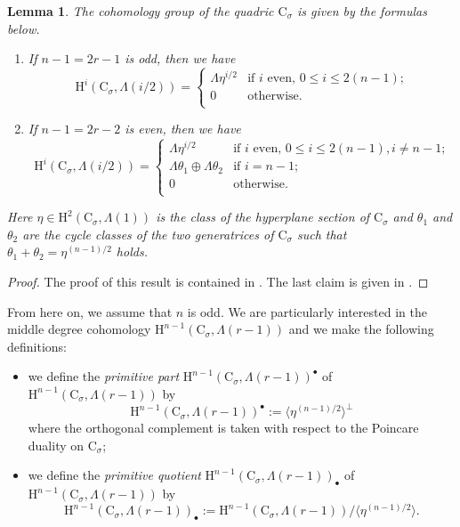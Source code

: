 \documentclass[10pt]{amsart}
\numberwithin{equation}{section}
\newtheorem{lemma}[equation]{Lemma}
\theoremstyle{definition}
\def\rmC{\mathrm{C}}
\def\rmH{\mathrm{H}}
\begin{document}
\begin{lemma}\label{quadric-class}
The cohomology group of the quadric $\rmC_{\sigma}$ is given by the formulas below.
\begin{enumerate}
\item If $n-1=2r-1$ is odd, then we have 
\begin{equation*}
\rmH^{i}(\rmC_{\sigma}, \Lambda(i/2))=\begin{cases}\Lambda\eta^{i/2} & \text{if $i$ even, $0\leq i\leq 2(n-1)$;}\\ 0 & \text{otherwise.}\\ \end{cases}
\end{equation*}
\item If $n-1=2r-2$ is even, then we have 
\begin{equation*}
\rmH^{i}(\rmC_{\sigma}, \Lambda(i/2))=\begin{cases}\Lambda\eta^{i/2} & \text{if $i$ even, $0\leq i\leq 2(n-1), i\neq n-1$;}\\   \Lambda\theta_{1}\oplus\Lambda\theta_{2} & \text{if $i=n-1$;}\\0 & \text{otherwise.}\\ \end{cases}
\end{equation*}
\end{enumerate}
Here $\eta\in \rmH^{2}(\rmC_{\sigma},\Lambda(1))$ is the class of the hyperplane section of $\rmC_{\sigma}$ and $\theta_{1}$ and $\theta_{2}$ are the cycle classes of the two generatrices of $\rmC_{\sigma}$ such that $\theta_{1}+\theta_{2}=\eta^{(n-1)/2}$ holds.
\end{lemma}
\begin{proof}
The proof of this result is contained in \cite[Expose XII Theorem 3.3]{SGA7}. The last claim is given in \cite[Theorem 3.3 (iii)(c)]{SGA7}.
\end{proof}

From here on, we assume that $n$ is odd. We are particularly interested in the middle degree cohomology $\rmH^{n-1}(\rmC_{\sigma}, \Lambda(r-1))$ and we make the following definitions: 
\begin{itemize}
\item we define the {\em primitive part} $\rmH^{n-1}(\rmC_{\sigma}, \Lambda(r-1))^{\bullet}$ of $\rmH^{n-1}(\rmC_{\sigma}, \Lambda(r-1))$ by
\begin{equation*}
\rmH^{n-1}(\rmC_{\sigma}, \Lambda(r-1))^{\bullet}:=\langle\eta^{(n-1)/2}\rangle^{\perp} 
\end{equation*}
where the orthogonal complement is taken with respect to the Poincare duality on $\rmC_{\sigma}$;
\item  we define the {\em primitive quotient} $\rmH^{n-1}(\rmC_{\sigma}, \Lambda(r-1))_{\bullet}$ of $\rmH^{n-1}(\rmC_{\sigma}, \Lambda(r-1))$ by
\begin{equation*}
\rmH^{n-1}(\rmC_{\sigma}, \Lambda(r-1))_{\bullet}:=\rmH^{n-1}(\rmC_{\sigma}, \Lambda(r-1))/\langle\eta^{(n-1)/2}\rangle.
\end{equation*}
\end{itemize}
\end{document}
